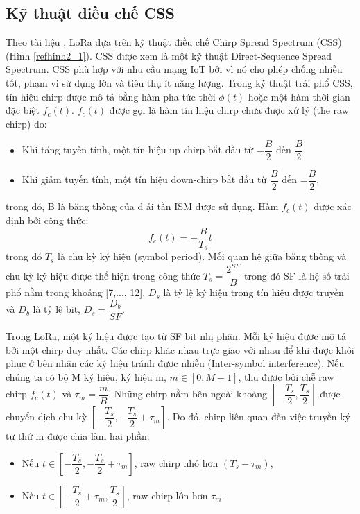 \subsection{Kỹ thuật điều chế CSS}
Theo tài liệu \cite{3}, LoRa dựa trên kỹ thuật điều chế Chirp Spread Spectrum (CSS) (Hình \ref{refhinh2_1}{}). CSS được xem là một kỹ thuật Direct-Sequence Spread Spectrum. CSS phù hợp với nhu cầu mạng IoT bởi vì nó cho phép chống nhiễu tốt, phạm vi sử dụng lớn và tiêu thụ ít năng lượng. Trong kỹ thuật trải phổ CSS, tín hiệu chirp được mô tả bằng hàm pha tức thời $\phi(t)$ hoặc một hàm thời gian đặc biệt $f_c(t)$. $f_c(t)$ được gọi là hàm tín hiệu chirp chưa được xử lý (the raw chirp) do:
\begin{itemize}
\item Khi tăng tuyến tính, một tín hiệu up-chirp bắt đầu từ $-\dfrac{B}{2}$ đến $\dfrac{B}{2}$,
\item Khi giảm tuyến tính, một tín hiệu down-chirp bắt đầu từ $\dfrac{B}{2}$ đến $-\dfrac{B}{2}$, 
\end{itemize}
trong đó, B là băng thông của d ải tần ISM được sử dụng. Hàm $f_c(t)$ được xác định bởi công thức:
\begin{equation}
f_c(t) = \pm \dfrac{B}{T_s}t
\end{equation}
trong đó $T_s$ là chu kỳ ký hiệu (symbol period). Mối quan hệ giữa băng thông và chu kỳ ký hiệu được thể hiện trong công thức $T_s = \dfrac{2^{SF}}{B}$ trong đó SF là hệ số trải phổ nằm trong khoảng [7,..., 12]. $D_s$ là tỷ lệ ký hiệu trong tín hiệu được truyền và $D_b$ là tỷ lệ bit, $D_s =\dfrac{D_b}{SF}$.
\par 
Trong LoRa, một ký hiệu được tạo từ SF bit nhị phân. Mỗi ký hiệu được mô tả bởi một chirp duy nhất. Các chirp khác nhau trực giao với nhau để khi được khôi phục ở bên nhận các ký hiệu tránh được nhiễu (Inter-symbol interference). Nếu chúng ta có bộ M ký hiệu, ký hiệu m, $m \in [0, M-1]$, thu được bởi chễ raw chirp $f_c(t)$ và $\tau_m = \dfrac{m}{B}$. Những chirp nằm bên ngoài khoảng $[-\dfrac{T_s}{2}, \dfrac{T_s}{2}]$ được chuyển dịch chu kỳ $[-\dfrac{T_s}{2}, -\dfrac{T_s}{2} + \tau_m]$. Do đó, chirp liên quan đến việc truyền ký tự thứ m được chia làm hai phần:
\begin{itemize}
\item Nếu  $t \in [-\dfrac{T_s}{2}, -\dfrac{T_s}{2} + \tau_m]$, raw chirp nhỏ hơn $(T_s - \tau_m)$,
\item Nếu $t \in [-\dfrac{T_s}{2} + \tau_m, \dfrac{T_s}{2}]$, raw chirp lớn hơn $\tau_m$.
\end{itemize}
